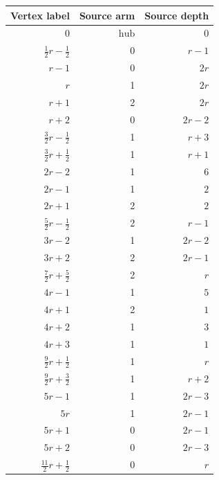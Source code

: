 \begin{longtable}{rrr}
Vertex label & Source arm & Source depth\\\hline\endhead
$0$ & $\mathrm{hub}$ & $0$\\
$\frac{1}{2}r-\frac{1}{2}$ & 0 & $r-1$\\
$r-1$ & 0 & $2r$\\
$r$ & 1 & $2r$\\
$r+1$ & 2 & $2r$\\
$r+2$ & 0 & $2r-2$\\
$\frac{3}{2}r-\frac{1}{2}$ & 1 & $r+3$\\
$\frac{3}{2}r+\frac{1}{2}$ & 1 & $r+1$\\
$2r-2$ & 1 & $6$\\
$2r-1$ & 1 & $2$\\
$2r+1$ & 2 & $2$\\
$\frac{5}{2}r-\frac{1}{2}$ & 2 & $r-1$\\
$3r-2$ & 1 & $2r-2$\\
$3r+2$ & 2 & $2r-1$\\
$\frac{7}{2}r+\frac{5}{2}$ & 2 & $r$\\
$4r-1$ & 1 & $5$\\
$4r+1$ & 2 & $1$\\
$4r+2$ & 1 & $3$\\
$4r+3$ & 1 & $1$\\
$\frac{9}{2}r+\frac{1}{2}$ & 1 & $r$\\
$\frac{9}{2}r+\frac{3}{2}$ & 1 & $r+2$\\
$5r-1$ & 1 & $2r-3$\\
$5r$ & 1 & $2r-1$\\
$5r+1$ & 0 & $2r-1$\\
$5r+2$ & 0 & $2r-3$\\
$\frac{11}{2}r+\frac{1}{2}$ & 0 & $r$\\
\end{longtable}
\endgroup

